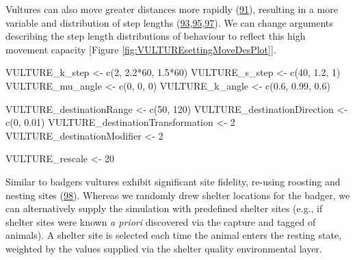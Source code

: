 \documentclass[10pt,a4paper]{article}
\newenvironment{Shaded}{}{}
\newcommand{\DecValTok}[1]{#1}
\newcommand{\FloatTok}[1]{#1}
\newcommand{\FunctionTok}[1]{#1}
\newcommand{\NormalTok}[1]{#1}
\newcommand{\OtherTok}[1]{#1}
\newcommand{\SpecialCharTok}[1]{#1}
\begin{document}
Vultures can also move greater distances more rapidly (\protect\hyperlink{ref-hribsek_first_2021}{91}), resulting in a more variable and distribution of step lengths (\protect\hyperlink{ref-garcia-jimenez_drivers_2018}{93},\protect\hyperlink{ref-margalida_spatial_2016}{95},\protect\hyperlink{ref-subedi_spatial_2020}{97}).
We can change arguments describing the step length distributions of behaviour to reflect this high movement capacity {[}Figure \ref{fig:VULTUREsettingMoveDesPlot}{]}.

\begin{Shaded}
\begin{Highlighting}[]
\NormalTok{VULTURE\_k\_step }\OtherTok{\textless{}{-}} \FunctionTok{c}\NormalTok{(}\DecValTok{2}\NormalTok{, }\FloatTok{2.2}\SpecialCharTok{*}\DecValTok{60}\NormalTok{, }\FloatTok{1.5}\SpecialCharTok{*}\DecValTok{60}\NormalTok{)}
\NormalTok{VULTURE\_s\_step }\OtherTok{\textless{}{-}} \FunctionTok{c}\NormalTok{(}\DecValTok{40}\NormalTok{, }\FloatTok{1.2}\NormalTok{, }\DecValTok{1}\NormalTok{)}
\NormalTok{VULTURE\_mu\_angle }\OtherTok{\textless{}{-}} \FunctionTok{c}\NormalTok{(}\DecValTok{0}\NormalTok{, }\DecValTok{0}\NormalTok{, }\DecValTok{0}\NormalTok{)}
\NormalTok{VULTURE\_k\_angle }\OtherTok{\textless{}{-}} \FunctionTok{c}\NormalTok{(}\FloatTok{0.6}\NormalTok{, }\FloatTok{0.99}\NormalTok{, }\FloatTok{0.6}\NormalTok{)}

\NormalTok{VULTURE\_destinationRange }\OtherTok{\textless{}{-}} \FunctionTok{c}\NormalTok{(}\DecValTok{50}\NormalTok{, }\DecValTok{120}\NormalTok{)}
\NormalTok{VULTURE\_destinationDirection }\OtherTok{\textless{}{-}} \FunctionTok{c}\NormalTok{(}\DecValTok{0}\NormalTok{, }\FloatTok{0.01}\NormalTok{)}
\NormalTok{VULTURE\_destinationTransformation }\OtherTok{\textless{}{-}} \DecValTok{2}
\NormalTok{VULTURE\_destinationModifier }\OtherTok{\textless{}{-}} \DecValTok{2}

\NormalTok{VULTURE\_rescale }\OtherTok{\textless{}{-}} \DecValTok{20}
\end{Highlighting}
\end{Shaded}

Similar to badgers vultures exhibit significant site fidelity, re-using roosting and nesting sites (\protect\hyperlink{ref-bracis_revisitation_2018}{98}).
Whereas we randomly drew shelter locations for the badger, we can alternatively supply the simulation with predefined shelter sites (e.g., if shelter sites were known \emph{a priori} discovered via the capture and tagged of animals).
A shelter site is selected each time the animal enters the resting state, weighted by the values supplied via the shelter quality environmental layer.
\end{document}

